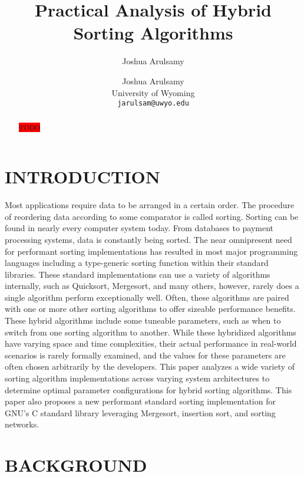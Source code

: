 \documentclass[12pt, conference]{ieeeconf}
\title{\LARGE \bf Practical Analysis of Hybrid Sorting Algorithms}
\author{Joshua Arulsamy}
\author{\parbox{3 in}{
\centering
Joshua Arulsamy\\
University of Wyoming\\
{\tt\small jarulsam@uwyo.edu}}}
\newcommand{\todo}{\colorbox{red}{TODO}}
\begin{document}
\maketitle
\thispagestyle{plain}
\pagestyle{plain}
\nocite{*}

\begin{abstract}

	\todo

\end{abstract}

\section{INTRODUCTION}

Most applications require data to be arranged in a certain order. The procedure
of reordering data according to some comparator is called sorting. Sorting can
be found in nearly every computer system today. From databases to payment
processing systems, data is constantly being sorted. The near omnipresent need
for performant sorting implementations has resulted in most major programming
languages including a type-generic sorting function within their standard
libraries. These standard implementations can use a variety of algorithms
internally, such as Quicksort, Mergesort, and many others, however, rarely does
a single algorithm perform exceptionally well. Often, these algorithms are
paired with one or more other sorting algorithms to offer sizeable performance
benefits. These hybrid algorithms include some tuneable parameters, such as when
to switch from one sorting algorithm to another. While these hybridized
algorithms have varying space and time complexities, their actual performance in
real-world scenarios is rarely formally examined, and the values for these
parameters are often chosen arbitrarily by the developers. This paper analyzes a
wide variety of sorting algorithm implementations across varying system
architectures to determine optimal parameter configurations for hybrid sorting
algorithms. This paper also proposes a new performant standard sorting
implementation for GNU's C standard library leveraging Mergesort, insertion
sort, and sorting networks.

\section{BACKGROUND}
\end{document}
